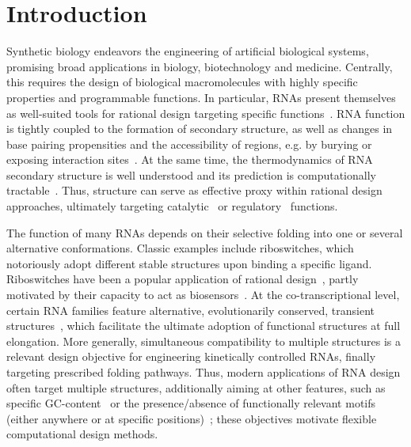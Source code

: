 \documentclass{bioinfo}
\newcommand{\parHead}[1]{\Final{\paragraph{#1}}}
\newcommand{\Final}[1]{#1}
\renewcommand{\Final}[1]{}
\newcommand{\Nuc}[1]{{\sf #1}}
\newcommand{\Cb}{\Nuc{C}}
\newcommand{\Gb}{\Nuc{G}}
\newcommand{\GCb}{\Gb\Cb}
\begin{document}
\maketitle



\section{Introduction}
\parHead{Design, applications and motivation for multiple design.}Synthetic biology endeavors the engineering of artificial biological
systems, promising broad applications in biology, biotechnology and
medicine. Centrally, this requires the design of biological
macromolecules with highly specific properties and programmable functions.
In particular, RNAs present themselves as well-suited tools for
rational design targeting specific functions~\citep{Kushwaha2016}. RNA function is tightly
coupled to the formation of secondary structure, as well as changes in
base pairing propensities and the accessibility of regions, e.g. by
burying or exposing interaction sites~\citep{Rodrigo2014}. At the same time, the
thermodynamics of RNA secondary structure is well understood and its prediction is
computationally tractable~\citep{McCaskill1990}. Thus,  structure can serve as effective
proxy within rational design approaches, ultimately targeting catalytic~\citep{Zhang2013} or regulatory~\citep{Rodrigo2014} functions.

\parHead{Motivating multiple RNA design.} The function of many RNAs
depends on their selective folding into one or several alternative
conformations. Classic examples include riboswitches, which
notoriously adopt different stable structures upon binding a specific
ligand. Riboswitches have been a popular application of rational
design~\citep{Wachsmuth2013,Domin2017}, partly motivated by their
capacity to act as biosensors~\citep{Findeiss2017}. At the
co-transcriptional level, certain RNA families feature alternative,
evolutionarily conserved, transient structures~\citep{Zhu2013}, which
facilitate the ultimate adoption of functional structures at full
elongation.  More generally, simultaneous compatibility to multiple
structures is a relevant design objective for engineering kinetically
controlled RNAs, finally targeting prescribed folding pathways. Thus,
modern applications of RNA design often target multiple structures,
additionally aiming at other features, such as specific
\GCb-content~\citep{Reinharz2013} or the presence/absence of
functionally relevant motifs (either anywhere or at specific
positions)~\citep{Zhou2013}; these objectives motivate flexible
computational design methods.
\end{document}
